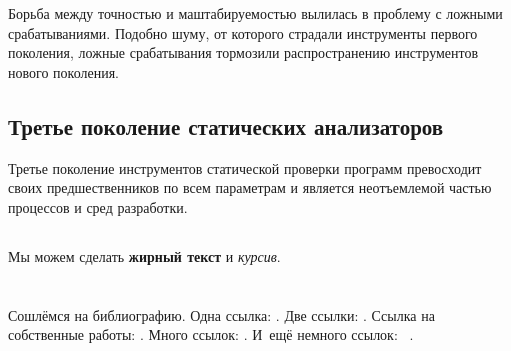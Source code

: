 Борьба между точностью и маштабируемостью вылилась в проблему с ложными срабатываниями. Подобно 
шуму, от которого страдали инструменты первого поколения, ложные срабатывания тормозили 
распространению инструментов нового поколения. 

\subsection{Третье поколение статических анализаторов}
Третье поколение инструментов статической проверки программ превосходит своих предшественников по
всем параметрам и является неотъемлемой частью процессов и сред разработки.  

\subsection{}

Мы можем сделать \textbf{жирный текст} и \textit{курсив}.

\section{}\label{sec:ch1/sec2}

\subsection{}

Сошлёмся на библиографию.
Одна ссылка: \cite[с.~54]{Sokolov}\cite[с.~36]{Gaidaenko}.
Две ссылки: \cite{Sokolov,Gaidaenko}.
Ссылка на собственные работы: \cite{vakbib1, confbib2}.
Много ссылок: %
\cite{Lermontov, Management, Borozda, Marketing, Constitution, FamilyCode,
Gost.7.0.53, Razumovski, Lagkueva, Pokrovski, Methodology, Berestova,
Kriger}%
%
.
И~ещё немного ссылок:~\cite{Article,Book,Booklet,Conference,Inbook,Incollection,Manual,Mastersthesis,
Misc,Phdthesis,Proceedings,Techreport,Unpublished}
\cite{medvedev2006jelektronnye, CEAT:CEAT581, doi:10.1080/01932691.2010.513279,
Gosele1999161,Li2007StressAnalysis, Shoji199895, test:eisner-sample,
test:eisner-sample-shorted, AB_patent_Pomerantz_1968, iofis_patent1960}
%
.


